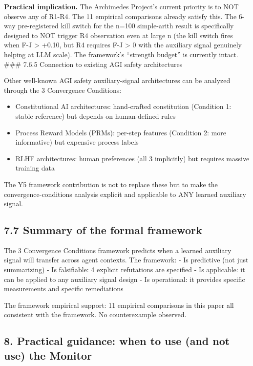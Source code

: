 \documentclass[
]{article}
\providecommand{\tightlist}{%
  \setlength{\itemsep}{0pt}\setlength{\parskip}{0pt}}
\begin{document}
\textbf{Practical implication.} The Archimedes Project's current
priority is to NOT observe any of R1-R4. The 11 empirical comparisons
already satisfy this. The 6-way pre-registered kill switch for the n=100
simple-arith result is specifically designed to NOT trigger R4
observation even at large n (the kill switch fires when F-J
\textgreater{} +0.10, but R4 requires F-J \textgreater{} 0 with the
auxiliary signal genuinely helping at LLM scale). The framework's
``strength budget'' is currently intact. \#\#\# 7.6.5 Connection to
existing AGI safety architectures

Other well-known AGI safety auxiliary-signal architectures can be
analyzed through the 3 Convergence Conditions:

\begin{itemize}
\tightlist
\item
  Constitutional AI architectures: hand-crafted constitution (Condition
  1: stable reference) but depends on human-defined rules
\item
  Process Reward Models (PRMs): per-step features (Condition 2: more
  informative) but expensive process labels
\item
  RLHF architectures: human preferences (all 3 implicitly) but requires
  massive training data
\end{itemize}

The Y5 framework contribution is not to replace these but to make the
convergence-conditions analysis explicit and applicable to ANY learned
auxiliary signal.

\subsection{7.7 Summary of the formal
framework}\label{summary-of-the-formal-framework}

The 3 Convergence Conditions framework predicts when a learned auxiliary
signal will transfer across agent contexts. The framework: - Is
predictive (not just summarizing) - Is falsifiable: 4 explicit
refutations are specified - Is applicable: it can be applied to any
auxiliary signal design - Is operational: it provides specific
measurements and specific remediations

The framework empirical support: 11 empirical comparisons in this paper
all consistent with the framework. No counterexample observed.

\subsection{8. Practical guidance: when to use (and not use) the
Monitor}\label{practical-guidance-when-to-use-and-not-use-the-monitor}
\end{document}
